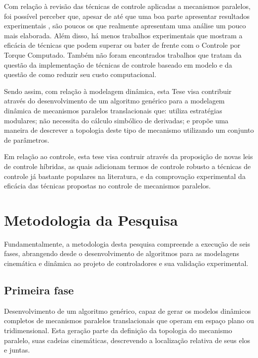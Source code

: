 \documentclass[]{politex}
\begin{document}
Com relação à revisão das técnicas de controle aplicadas a mecanismos paralelos, foi possível perceber que, apesar de até que uma boa parte apresentar resultados experimentais \cite{Honegger, Cheng, Shang, Yen, Codourey, Vivas, Duchaine, Chemori, Begon}, são poucos os que realmente apresentam uma análise um pouco mais elaborada. Além disso, há menos trabalhos experimentais que mostram a eficácia de técnicas que podem superar ou bater de frente com o Controle por Torque Computado. Também não foram encontrados trabalhos que tratam da questão da implementação de técnicas de controle baseado em modelo e da questão de como reduzir seu custo computacional.

Sendo assim, com relação à modelagem dinâmica, esta Tese visa contribuir através do desenvolvimento de um algoritmo genérico para a modelagem dinâmica de mecanismos paralelos translacionais que: utiliza estratégias modulares; não necessita do cálculo simbólico de derivadas; e propõe uma maneira de descrever a topologia deste tipo de mecanismo utilizando um conjunto de parâmetros.

Em relação ao controle, esta tese visa contruir através da proposição de novas leis de controle híbridas, as quais adicionam termos de controle robusto a técnicas de controle já bastante populares na literatura, e da comprovação experimental da eficácia das técnicas propostas no controle de mecanismos paralelos.

\chapter{Metodologia da Pesquisa}\label{method}

Fundamentalmente, a metodologia desta pesquisa compreende a execução de seis fases, abrangendo desde o desenvolvimento de algoritmos para as modelagens cinemática e dinâmica ao projeto de controladores e sua validação experimental.

\section{Primeira fase} 
Desenvolvimento de um algoritmo genérico, capaz de gerar os modelos dinâmicos completos de mecanismos paralelos translacionais que operam em espaço plano ou tridimensional. Esta geração parte da definição da topologia do mecanismo paralelo, suas cadeias cinemáticas, descrevendo a localização relativa de seus elos e juntas.
\end{document}
